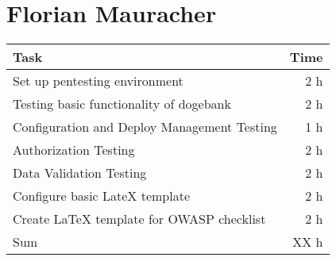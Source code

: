 \section*{Florian Mauracher}
\begin{table}[h!tpb]
  \centering
  \begin{tabularx}{\textwidth}{X r}
    \toprule
      Task & Time \\
    \midrule
      Set up pentesting environment & 2 h \\
      Testing basic functionality of dogebank & 2 h \\
      Configuration and Deploy Management Testing & 1 h \\
      Authorization Testing & 2 h \\
      Data Validation Testing & 2 h \\
      Configure basic LateX template & 2 h \\
      Create LaTeX template for OWASP checklist & 2 h \\
    \midrule
      Sum & XX h \\
    \bottomrule
  \end{tabularx}
\end{table}

\clearpage
